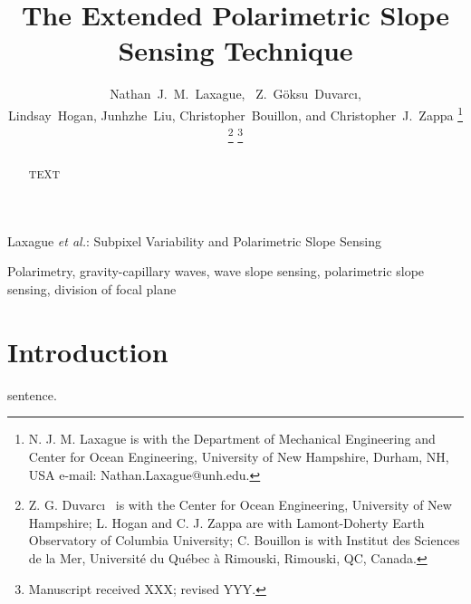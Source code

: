 \documentclass[letterpaper,journal]{IEEEtran}
\begin{document}
%
\title{The Extended Polarimetric Slope Sensing Technique}

\author{Nathan~J.~M.~Laxague,~
        Z.~G\"oksu~Duvarc\i,\\
        Lindsay~Hogan, Junhzhe~Liu,
        Christopher~Bouillon, and Christopher~J.~Zappa%
\thanks{N. J. M. Laxague is with the Department
of Mechanical Engineering and Center for Ocean Engineering, University of New Hampshire, Durham, NH, USA e-mail: Nathan.Laxague@unh.edu.}%
\thanks{Z. G. Duvarc\i~ is with the Center for Ocean Engineering, University of New Hampshire; L. Hogan and C. J. Zappa are with Lamont-Doherty Earth Observatory of Columbia University; C. Bouillon is with Institut des Sciences de la Mer, Université du Québec à Rimouski, Rimouski, QC, Canada.}%
\thanks{Manuscript received XXX; revised YYY.}}

%
{Laxague \MakeLowercase{\textit{et al.}}: Subpixel Variability and Polarimetric Slope Sensing}

\maketitle

\begin{abstract}
TEXT

\end{abstract}

\begin{IEEEkeywords}
Polarimetry, gravity-capillary waves, wave slope sensing, polarimetric slope sensing, division of focal plane
\end{IEEEkeywords}

\IEEEpeerreviewmaketitle

\vspace{-15pt}

\section{Introduction}
\label{sec:intro}
 sentence.
\end{document}
